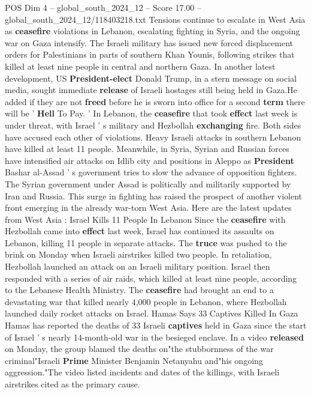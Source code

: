 \begin{textsample}{POS Dim 4 – global\_south\_2024\_12 – Score 17.00 – global\_south\_2024\_12/118403218.txt}  \label{ex:f4_pos_240}
Tensions continue to escalate in West Asia as \textbf{ceasefire} violations in Lebanon, escalating fighting in Syria, and the ongoing war on Gaza intensify.
The Israeli military has issued new forced displacement orders for Palestinians in parts of southern Khan Younis, following strikes that killed at least nine people in central and northern Gaza.
In another latest development, US \textbf{President-elect} Donald Trump, in a stern message on social media, sought immediate \textbf{release} of Israeli hostages still being held in Gaza.He added if they are not \textbf{freed} before he is sworn into office for a second \textbf{term} there will be ' \textbf{Hell} To Pay. ' In Lebanon, the \textbf{ceasefire} that took \textbf{effect} last week is under threat, with Israel ' s military and Hezbollah \textbf{exchanging} fire.
Both sides have accused each other of violations.
Heavy Israeli attacks in southern Lebanon have killed at least 11 people.
Meanwhile, in Syria, Syrian and Russian forces have intensified air attacks on Idlib city and positions in Aleppo as \textbf{President} Bashar al-Assad ' s government tries to slow the advance of opposition fighters.
The Syrian government under Assad is politically and militarily supported by Iran and Russia.
This surge in fighting has raised the prospect of another violent front emerging in the already war-torn West Asia.
Here are the latest updates from West Asia : Israel Kills 11 People In Lebanon Since the \textbf{ceasefire} with Hezbollah came into \textbf{effect} last week, Israel has continued its assaults on Lebanon, killing 11 people in separate attacks.
The \textbf{truce} was pushed to the brink on Monday when Israeli airstrikes killed two people.
In retaliation, Hezbollah launched an attack on an Israeli military position.
Israel then responded with a series of air raids, which killed at least nine people, according to the Lebanese Health Ministry.
The \textbf{ceasefire} had brought an end to a devastating war that killed nearly 4,000 people in Lebanon, where Hezbollah launched daily rocket attacks on Israel.
Hamas Says 33 Captives Killed In Gaza Hamas has reported the deaths of 33 Israeli \textbf{captives} held in Gaza since the start of Israel ' s nearly 14-month-old war in the besieged enclave.
In a video \textbf{released} on Monday, the group blamed the deaths on"the stubbornness of the war criminal"Israeli \textbf{Prime} Minister Benjamin Netanyahu and"his ongoing aggression."The video listed incidents and dates of the killings, with Israeli airstrikes cited as the primary cause.

\end{textsample}
